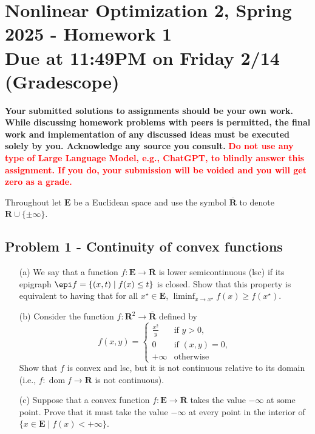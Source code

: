 \documentclass[11pt]{article}
\date{}
\title{}
\newcommand{\RR}{\mathbf{R}}
\newcommand{\E}{\mathbf{E}}
\newcommand{\bR}{\overline{\mathbf{R}}}
\newcommand{\dom}{\operatorname{dom}}
\begin{document}
\section*{\textbf{Nonlinear Optimization 2, Spring 2025 - Homework 1} \\ Due at 11:49PM on Friday 2/14 (Gradescope)}
\label{sec:orgd05b6e6}
\textbf{Your submitted solutions to assignments should be your own work. While discussing homework problems with peers is permitted, the final work and implementation of any discussed ideas must be executed solely by you. Acknowledge any source you consult.}
\textbf{\textcolor{red}{Do not use any type of Large Language Model, e.g., ChatGPT, to blindly answer this assignment. If you do, your submission will be voided and you will get zero as a grade.}} \vspace{.5cm}

\noindent Throughout let \(\E\) be a Euclidean space and use the symbol \(\bR\) to denote \(\RR \cup \{\pm \infty\}\).
\subsection*{Problem 1 - Continuity of convex functions}
\label{sec:org04827ac}
\begin{itemize}
\item[(a)] We say that a function $f \colon \E \rightarrow \bR$ is lower semicontinuous (lsc) if its epigraph $\epi f = \{(x, t) \mid f(x) \leq t\}$ is closed. Show that this property is equivalent to having that for all $x^{\star} \in \E$, $\liminf_{x \rightarrow x^{\star}} f(x) \geq f(x^{\star}).$
\item[(b)] Consider the function $f\colon \RR^{2} \rightarrow \bR$ defined by
$$
f(x, y) = \begin{cases} \frac{x^{2}}{y} & \text{if }y>0, \\
0 & \text{if }(x, y) = 0, \\
+ \infty & \text{otherwise} \end{cases}
$$
Show that $f$ is convex and lsc, but it is not continuous relative to its domain (i.e., $f\colon \dom f \rightarrow \RR$ is not continuous).
\item[(c)] Suppose that a convex function $f\colon \E \rightarrow \bR$ takes the value $-\infty$ at some point. Prove that it must take the value $-\infty$ at every point in the interior of $\{x \in \E \mid f(x) < +\infty\}$.
\end{itemize}
\end{document}
